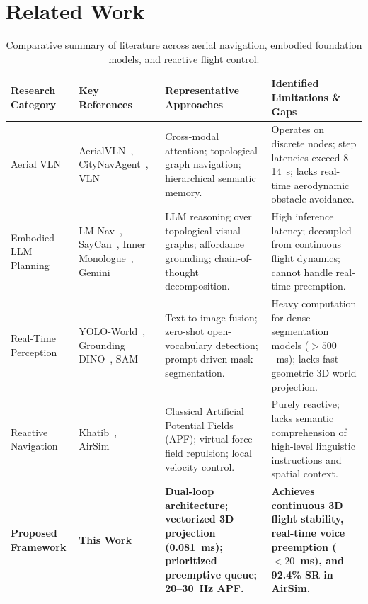 \documentclass[conference]{IEEEtran}
\begin{document}
\section{Related Work}

\begin{table}[t]
	\centering
	\small
	\setlength{\tabcolsep}{3.5pt}
	\renewcommand{\arraystretch}{1.05}
	\begin{tabular}{p{2.8cm} p{2.1cm} p{5.6cm} p{5.9cm}}
		\hline
		\textbf{Research Category} & \textbf{Key References} & \textbf{Representative Approaches} & \textbf{Identified Limitations \& Gaps} \\
		\hline
		Aerial VLN & AerialVLN~\cite{gao2023aerialvln}, CityNavAgent~\cite{zhang2024citynavagent}, VLN~\cite{anderson2018vln} & Cross-modal attention; topological graph navigation; hierarchical semantic memory. & Operates on discrete nodes; step latencies exceed 8--14~s; lacks real-time aerodynamic obstacle avoidance. \\
		Embodied LLM Planning & LM-Nav~\cite{shah2022lmnav}, SayCan~\cite{ahn2022saycan}, Inner Monologue~\cite{huang2022inner}, Gemini~\cite{gemini2024report} & LLM reasoning over topological visual graphs; affordance grounding; chain-of-thought decomposition. & High inference latency; decoupled from continuous flight dynamics; cannot handle real-time preemption. \\
		Real-Time Perception & YOLO-World~\cite{cheng2024yoloworld}, Grounding DINO~\cite{liu2023groundingdino}, SAM~\cite{kirillov2023sam} & Text-to-image fusion; zero-shot open-vocabulary detection; prompt-driven mask segmentation. & Heavy computation for dense segmentation models ($>500$~ms); lacks fast geometric 3D world projection. \\
		Reactive Navigation & Khatib~\cite{khatib1986apf}, AirSim~\cite{shah2018airsim} & Classical Artificial Potential Fields (APF); virtual force field repulsion; local velocity control. & Purely reactive; lacks semantic comprehension of high-level linguistic instructions and spatial context. \\
		\textbf{Proposed Framework} & \textbf{This Work} & \textbf{Dual-loop architecture; vectorized 3D projection (0.081~ms); prioritized preemptive queue; 20--30~Hz APF.} & \textbf{Achieves continuous 3D flight stability, real-time voice preemption ($<20$~ms), and 92.4\% SR in AirSim.} \\
		\hline
	\end{tabular}
	\caption{Comparative summary of literature across aerial navigation, embodied foundation models, and reactive flight control.}
	\label{tab:related_work}
\end{table}
\end{document}
